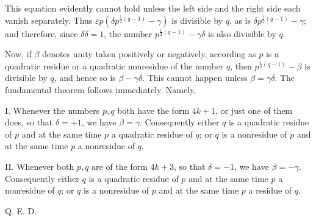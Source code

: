 This equation evidently cannot hold unless the left side and the right side each vanish separately. Thus $\varepsilon p(\delta p^{\frac12(q-1)}-\gamma)$ is divisible by $q$, as is $\delta p^{\frac12(q-1)}-\gamma$; and therefore, since $\delta\delta=1$, the number $p^{\frac12(q-1)}-\gamma\delta$ is also divisible by $q$.

Now, if $\beta$ denotes unity taken positively or negatively, according as $p$ is a quadratic residue or a quadratic nonresidue of the number $q$, then $p^{\frac12(q-1)}-\beta$ is divisible by $q$, and hence so is $\beta-\gamma\delta$. This cannot happen unless $\beta=\gamma\delta$. The fundamental theorem follows immediately. Namely,

I. Whenever the numbers $p,q$ both have the form $4k+1$, or just one of them does, so that $\delta=+1$, we have $\beta=\gamma$. Consequently either $q$ is a quadratic residue of $p$ and at the same time $p$ a quadratic residue of $q$; or $q$ is a nonresidue of $p$ and at the same time $p$ a nonresidue of $q$.

II. Whenever both $p,q$ are of the form $4k+3$, so that $\delta=-1$, we have $\beta=-\gamma$. Consequently either $q$ is a quadratic residue of $p$ and at the same time $p$ a nonresidue of $q$; or $q$ is a nonresidue of $p$ and at the same time $p$ a residue of $q$.

Q. E. D.
